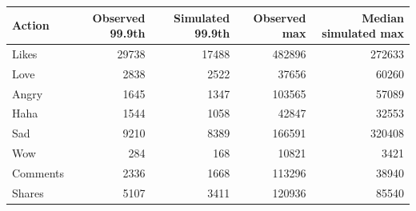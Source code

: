 \begin{tabular}{lrrrr}
\toprule
Action & Observed 99.9th & Simulated 99.9th & Observed max & Median simulated max \\
\midrule
Likes & 29738 & 17488 & 482896 & 272633 \\
Love & 2838 & 2522 & 37656 & 60260 \\
Angry & 1645 & 1347 & 103565 & 57089 \\
Haha & 1544 & 1058 & 42847 & 32553 \\
Sad & 9210 & 8389 & 166591 & 320408 \\
Wow & 284 & 168 & 10821 & 3421 \\
Comments & 2336 & 1668 & 113296 & 38940 \\
Shares & 5107 & 3411 & 120936 & 85540 \\
\bottomrule
\end{tabular}
